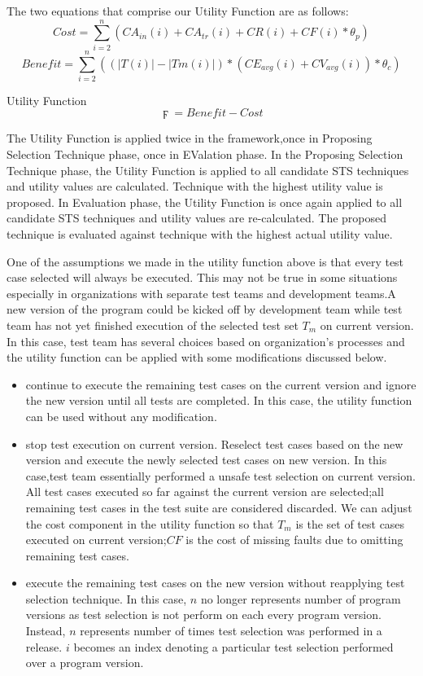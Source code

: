 The two equations that comprise our Utility Function are as follows: 
$$ Cost = \sum_{i=2}^{n}(CA_{in}(i)+CA_{tr}(i)+CR(i)+CF(i)*\theta_p)$$ 
$$ Benefit = \sum_{i=2}^n((|T(i)|-|Tm(i)|)*(CE_{avg}(i)+CV_{avg}(i))*\theta_c)$$

Utility Function $$ \digamma = Benefit - Cost $$

The Utility Function is applied  twice in the framework,once in Proposing Selection Technique phase, once in EValation
phase. In the Proposing Selection Technique phase, the Utility Function is
applied to all candidate STS techniques and utility values are calculated.
Technique with the highest utility value is proposed. In Evaluation phase,  the
Utility Function is once again applied to all candidate STS techniques and
utility values are re-calculated. The proposed technique is evaluated against
technique with the highest actual utility value.

One of the assumptions we made in the utility function above is that
every test case selected will always be executed. This may not be true in some
situations especially in organizations with separate test teams and development
teams.A new version of the program could be kicked off by development team while test team has not yet finished execution of the
selected test set $T_m$ on current version. In this case, test team has
several choices based on organization's processes and the utility function can
be applied with some modifications discussed below.
\begin{itemize}
  \item continue to execute the remaining test cases on the current
  version and ignore the new version until all tests are completed. In
  this case, the utility function can be used without any modification.
  \item stop test execution on current version. Reselect test cases based on the
  new version and execute the newly selected test cases on new version. In this
  case,test team essentially performed a unsafe test selection on current
  version. All test cases executed so far against the current version
  are selected;all remaining test cases in the test suite are considered
  discarded. We can adjust the cost component in the utility function so that
  $T_m$ is the set of test cases executed on current version;$CF$ is the
  cost of missing faults due to omitting remaining test cases.
  \item execute the remaining test cases on the new version without reapplying
  test selection technique. In this case, $n$ no longer represents number of
  program versions as test selection is not perform on each every program
  version. Instead, $n$ represents number of times test selection was performed
  in a release. $i$ becomes an index denoting a particular test selection performed over a program version. 
\end{itemize}


